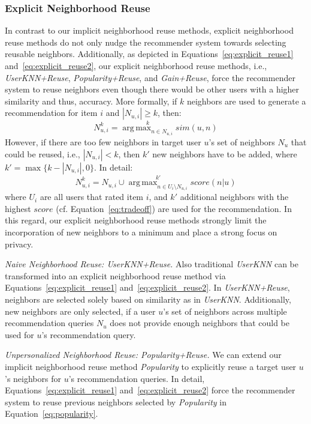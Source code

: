 \documentclass[manuscript,review,anonymous]{acmart}
\DeclareMathOperator*{\argmax}{arg\,max}
\begin{document}
\subsubsection{Explicit Neighborhood Reuse}
\label{subsubsec:explicit_reuse}
In contrast to our implicit neighborhood reuse methods, explicit neighborhood reuse methods do not only nudge the recommender system towards selecting reusable neighbors.
Additionally, as depicted in Equations~\ref{eq:explicit_reuse1} and~\ref{eq:explicit_reuse2}, our explicit neighborhood reuse methods, i.e., \emph{UserKNN+Reuse}, \emph{Popularity+Reuse}, and \emph{Gain+Reuse}, force the recommender system to reuse neighbors even though there would be other users with a higher similarity and thus, accuracy.
More formally, if $k$ neighbors are used to generate a recommendation for item $i$ and $|N_{u, i}| \geq k$, then:
\begin{equation}
    \label{eq:explicit_reuse1}
    N^k_{u, i} = \stackrel{k}{\argmax_{n \in N_{u, i}}} sim(u, n)
\end{equation}
However, if there are too few neighbors in target user $u$'s set of neighbors $N_u$ that could be reused, i.e., $|N_{u, i}| < k$, then $k'$ new neighbors have to be added, where $k' = \max\{ k - |N_{u, i}|, 0 \}$. In detail:  
\begin{equation}
    \label{eq:explicit_reuse2}
    N^k_{u, i} = N^{}_{u, i} \cup \stackrel{k'}{\argmax_{n \in U_i\setminus N_{u, i}}} score(n|u)
\end{equation}
where $U_i$ are all users that rated item $i$, and $k'$ additional neighbors with the highest $score$ (cf. Equation~\ref{eq:tradeoff}) are used for the recommendation. 
In this regard, our explicit neighborhood reuse methods strongly limit the incorporation of new neighbors to a minimum and place a strong focus on privacy.

\vspace{2mm} \noindent \emph{Naive Neighborhood Reuse: UserKNN+Reuse.}
Also traditional \emph{UserKNN} can be transformed into an explicit neighborhood reuse method via Equations~\ref{eq:explicit_reuse1} and~\ref{eq:explicit_reuse2}.
In \emph{UserKNN+Reuse}, neighbors are selected solely based on similarity as in \emph{UserKNN}.
Additionally, new neighbors are only selected, if a user $u$'s set of neighbors across multiple recommendation queries $N_u$ does not provide enough neighbors that could be used for $u$'s recommendation query.

\vspace{2mm} \noindent \emph{Unpersonalized Neighborhood Reuse: Popularity+Reuse.}
We can extend our implicit neighborhood reuse method \emph{Popularity} to explicitly reuse a target user $u$'s neighbors for $u$'s recommendation queries.
In detail, Equations~\ref{eq:explicit_reuse1} and~\ref{eq:explicit_reuse2} force the recommender system to reuse previous neighbors selected by \emph{Popularity} in Equation~\ref{eq:popularity}.
\end{document}
